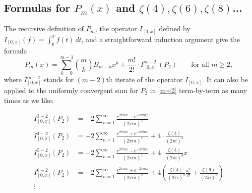 \documentclass{article}
\theoremstyle{definition}
\numberwithin{equation}{subsection}
\begin{document}
\subsection*{Formulas for $P_m(x)$ and $\zeta(4),\zeta(6),\zeta(8)$...}
The recursive definition of $P_m$, the operator $I_{[0,x]}$ defined by $I_{[0,x]}(f)=\int_0^xf(t)\,dt$, and a straightforward induction argument give the formula  
\begin{equation}\label{P_m}
P_m(x)=\sum_{k=0}^{m-3}\binom{m}{k}B_{m-k}x^k+\frac{m!}{2!}\cdot I_{[0,x]}^{m-2}(P_2)\qquad\text{for all }m\geq2,
\end{equation}
where $I_{[0,x]}^{m-2}$ stands for $(m-2)$th iterate of the operator $I_{[0,x]}$. It can also be applied to the uniformly convergent sum for $P_2$ in \eqref{m=2} term-by-term as many times as we like:

\begin{align*}
I_{[0,x]}^{3-2}(P_2)&=-2\sum_{n=1}^\infty\frac{e^{2\pi inx}-e^{-2\pi inx}}{(2\pi in)^3}\\
I_{[0,x]}^{4-2}(P_2)&=-2\sum_{n=1}^\infty\frac{e^{2\pi inx}+e^{-2\pi inx}}{(2\pi in)^4}+4\cdot\frac{\zeta(4)}{(2\pi i)^4}\\
I_{[0,x]}^{5-2}(P_2)&=-2\sum_{n=1}^\infty\frac{e^{2\pi inx}-e^{-2\pi inx}}{(2\pi in)^5}+4\cdot\frac{\zeta(4)}{(2\pi i)^4}x\\
I_{[0,x]}^{6-2}(P_2)&=-2\sum_{n=1}^\infty\frac{e^{2\pi inx}+e^{-2\pi inx}}{(2\pi in)^6}+4\left(\frac{\zeta(4)}{(2\pi i)^4}\frac{x^2}{2!}+\frac{\zeta(6)}{(2\pi i)^6}\right)\\
\vdots
\end{align*}
\end{document}
